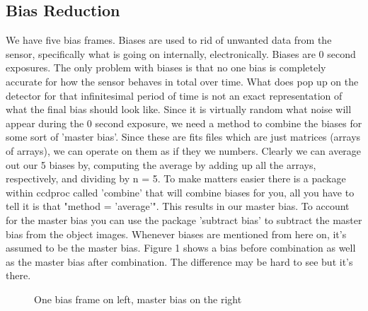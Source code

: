 \documentclass[modern]{aastex63}
\begin{document}
\subsection{Bias Reduction}
We have five bias frames. Biases are used to rid of unwanted data from the sensor, specifically what is going on internally, electronically. Biases are 0 second exposures. The only problem with biases is that no one bias is completely accurate for how the sensor behaves in total over time. What does pop up on the detector for that infinitesimal period of time is not an exact representation of what the final bias should look like. Since it is virtually random what noise will appear during the 0 second exposure, we need a method to combine the biases for some sort of 'master bias'. Since these are fits files which are just matrices (arrays of arrays), we can operate on them as if they we numbers. Clearly we can average out our 5 biases by, computing the average by adding up all the arrays, respectively, and dividing by n = 5. To make matters easier there is a package within ccdproc called 'combine' that will combine biases for you, all you have to tell it is that "method = 'average'". This results in our master bias. To account for the master bias you can use the package 'subtract bias' to subtract the master bias from the object images. Whenever biases are mentioned from here on, it's assumed to be the master bias. Figure 1 shows a bias before combination as well as the master bias after combination. The difference may be hard to see but it's there.


\begin{figure}[htb!]
\caption{One bias frame on left, master bias on the right \label{fig:f2}\label{fig:f4}}
\end{figure}
\end{document}
